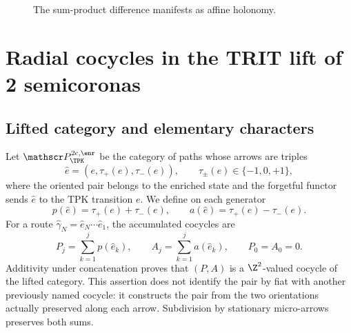 \begin{figure}[!htb]
\centering
{}
\caption{The sum-product difference manifests as affine holonomy.}
\label{espiral:fig:cuadrado-afin}
\end{figure}

\chapter{Radial cocycles in the TRIT lift of 2 semicoronas}
\label{espiral:chap:cociclos-radiales}

\section{Lifted category and elementary characters}

Let \(\mathscr P_{\TPK}^{2\mathrm c,\enr}\) be the category of paths whose
arrows are triples
\[
 \widehat e=(e,\tau_+(e),\tau_-(e)),
 \qquad \tau_\pm(e)\in\{-1,0,+1\},
\]
where the oriented pair belongs to the enriched state and the forgetful functor
sends \(\widehat e\) to the TPK transition \(e\). We define on each generator
\begin{equation}
 p(\widehat e)=\tau_+(e)+\tau_-(e),
 \qquad
 a(\widehat e)=\tau_+(e)-\tau_-(e).
 \label{espiral:eq:carta-doble-trit}
\end{equation}
For a route \(\widehat\gamma_N=\widehat e_N\cdots\widehat e_1\), the
accumulated cocycles are
\begin{equation}
 P_j=\sum_{k=1}^{j}p(\widehat e_k),
 \qquad
 A_j=\sum_{k=1}^{j}a(\widehat e_k),
 \qquad P_0=A_0=0.
 \label{espiral:eq:cociclos-radiales}
\end{equation}
Additivity under concatenation proves that \((P,A)\) is a \(\Z^2\)-valued cocycle of the lifted category. This assertion does not identify the pair by fiat with another previously named cocycle: it constructs the pair from the two orientations actually preserved along each arrow. Subdivision by stationary micro-arrows preserves both sums.

